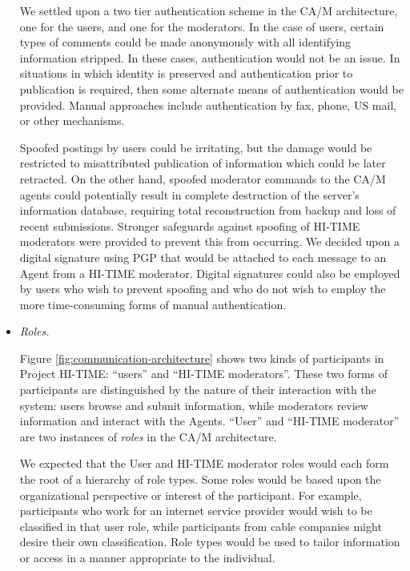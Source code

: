 \begin{itemize}
  We settled upon a two tier authentication scheme in the CA/M architecture,
  one for the users, and one for the moderators.  In the case of users,
  certain types of comments could be made anonymously with all identifying
  information stripped. In these cases, authentication would not be an issue.
  In situations in which identity is preserved and authentication prior to
  publication is required, then some alternate means of authentication would
  be provided.  Manual approaches include authentication by fax, phone, US
  mail, or other mechanisms.

  Spoofed postings by users could be irritating, but the damage would be
  restricted to misattributed publication of information which could be
  later retracted. On the other hand, spoofed moderator commands to the
  CA/M agents could potentially result in complete destruction of the
  server's information database, requiring total reconstruction from
  backup and loss of recent submissions.  Stronger safeguards against
  spoofing of HI-TIME moderators were provided to prevent this from
  occurring.  We decided upon a digital signature using PGP that would be
  attached to each message to an Agent from a HI-TIME moderator.  Digital
  signatures could also be employed by users who wish to prevent spoofing
  and who do not wish to employ the more time-consuming forms of manual
  authentication.


\item {\em Roles.}  

  Figure \ref{fig:communication-architecture} shows two kinds of
  participants in Project HI-TIME: ``users'' and ``HI-TIME moderators''.
  These two forms of participants are distinguished by the nature of
  their interaction with the system: users browse and submit information,
  while moderators review information and interact with the Agents.
  ``User'' and ``HI-TIME moderator'' are two instances of {\em roles\/}
  in the CA/M architecture. 

  We expected that the User and HI-TIME moderator roles would each form
  the root of a hierarchy of role types.  Some roles would be based upon
  the organizational perspective or interest of the participant. For
  example, participants who work for an internet service provider would
  wish to be classified in that user role, while participants from cable
  companies might desire their own classification.  Role types would be
  used to tailor information or access in a manner appropriate to the
  individual.

\end{itemize}

